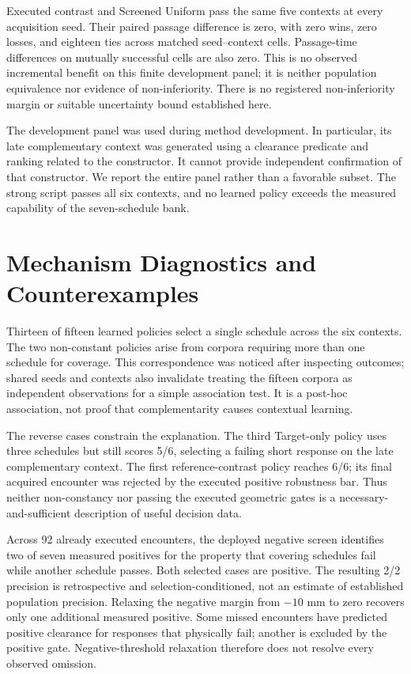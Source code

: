 \documentclass[letterpaper,10pt,conference]{ieeeconf}
\begin{document}
Executed contrast and Screened Uniform pass the same five contexts at every
acquisition seed. Their paired passage difference is zero, with zero wins,
zero losses, and eighteen ties across matched seed--context cells. Passage-time
differences on mutually successful cells are also zero. This is no observed
incremental benefit on this finite development panel; it is neither population
equivalence nor evidence of non-inferiority. There is no registered
non-inferiority margin or suitable uncertainty bound established here.

The development panel was used during method development. In particular, its
late complementary context was generated using a clearance predicate and
ranking related to the constructor. It cannot provide independent confirmation
of that constructor. We report the entire panel rather than a favorable subset.
The strong script passes all six contexts, and no learned policy exceeds the
measured capability of the seven-schedule bank.

\section{Mechanism Diagnostics and Counterexamples}
Thirteen of fifteen learned policies select a single schedule across the six
contexts. The two non-constant policies arise from corpora requiring more than
one schedule for coverage. This correspondence was noticed after inspecting
outcomes; shared seeds and contexts also invalidate treating the fifteen
corpora as independent observations for a simple association test. It is a
post-hoc association, not proof that complementarity causes contextual learning.

The reverse cases constrain the explanation. The third Target-only policy uses
three schedules but still scores 5/6, selecting a failing short response on the
late complementary context. The first reference-contrast policy reaches 6/6;
its final acquired encounter was rejected by the executed positive robustness
bar. Thus neither non-constancy nor passing the executed geometric gates is a
necessary-and-sufficient description of useful decision data.

Across 92 already executed encounters, the deployed negative screen identifies
two of seven measured positives for the property that covering schedules fail
while another schedule passes. Both selected cases are positive. The resulting
2/2 precision is retrospective and selection-conditioned, not an estimate of
established population precision. Relaxing the negative margin from $-10$ mm to
zero recovers only one additional measured positive. Some missed encounters
have predicted positive clearance for responses that physically fail; another
is excluded by the positive gate. Negative-threshold relaxation therefore does
not resolve every observed omission.
\end{document}
